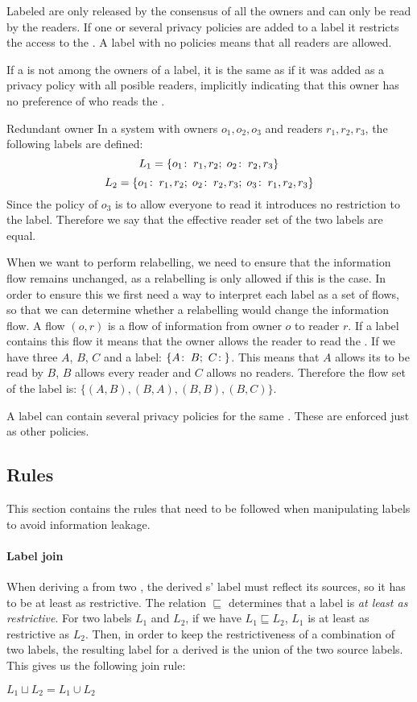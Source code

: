 Labeled \xvalues{} are only released by the consensus of all the owners and can only be read by the readers.
If one or several privacy policies are added to a label it restricts the access to the \xvalue{}.
A label with no policies  means that all readers are allowed.

If a \principal{} is not among the owners of a label, it is the same as if it was added as a privacy policy with all posible readers, implicitly indicating that this owner has no preference of who reads the \xvalue{}.

\begin{example}{Redundant owner}
In a system with owners $o_1, o_2, o_3$ and readers $r_1, r_2, r_3$, the following labels are defined:
$$L_1 = \{o_1\!:\;r_1,r_2;\; o_2\!:\;r_2, r_3\}$$
$$L_2 = \{o_1\!:\;r_1,r_2;\; o_2\!:\;r_2, r_3;\; o_3\!:\;r_1, r_2, r_3\}$$
Since the policy of $o_3$ is to allow everyone to read it introduces no restriction to the label.
Therefore we say that the effective reader set of the two labels are equal.
\end{example}

When we want to perform relabelling, we need to ensure that the information flow remains unchanged, as a relabelling is only allowed if this is the case.
In order to ensure this we first need a way to interpret each label as a set of flows, so that we can determine whether a relabelling would change the information flow.
A flow $(o,r)$ is a flow of information from owner $o$ to reader $r$.
If a label contains this flow it means that the owner allows the reader to read the \xvalue{}.
If we have three \principals{} $A$, $B$, $C$ and a label: $\{\policy{A}{B}; \ \policy{C}{}\}$.
This means that $A$ allows its \xvalue{} to be read by $B$, $B$ allows every reader and $C$ allows no readers.
Therefore the flow set of the label is: $\{(A,B), (B,A), (B,B), (B,C) \}$.

A label can contain several privacy policies for the same \principal{}.
These are enforced just as other policies.

\subsection{Rules}
This section contains the rules that need to be followed when manipulating labels to avoid information leakage.

\paragraph{Label join}
When deriving a \xvalue{} from two \xvalues{}, the derived \xvalue{}s' label must reflect its sources, so it has to be at least as restrictive.
The relation $\sqsubseteq$ determines that a label is \textit{at least as restrictive}.
For two labels $L_1$ and $L_2$, if we have $L_1 \sqsubseteq L_2$, $L_1$ is at least as restrictive as $L_2$.
Then, in order to keep the restrictiveness of a combination of two labels, the resulting label for a derived \xvalue{} is the union of the two source labels.
This gives us the following join rule:
\begin{definition}
  $L_1 \sqcup L_2 = L_1 \cup L_2$
\end{definition}

